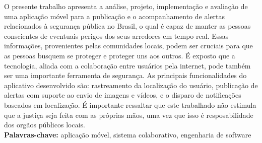 \documentclass[
	12pt,				%
	openright,			%
	oneside,			%
	a4paper,			%
	english,			%
	french,				%
	spanish,			%
	brazil,				%
	]{lib/abntex2}
\begin{document}




\setlength{\absparsep}{18pt} %

\begin{resumo}
	O presente trabalho apresenta a análise, projeto, implementação e avaliação de uma aplicação móvel para a publicação e o acompanhamento de alertas relacionados à segurança pública no Brasil, o qual é capaz de manter as pessoas conscientes de eventuais perigos dos seus arredores em tempo real. Essas informações, provenientes pelas comunidades locais, podem ser cruciais para que as pessoas busquem se proteger e proteger uns aos outros. É exposto que a tecnologia, aliada com a colaboração entre usuários pela internet, pode também ser uma importante ferramenta de segurança. As principais funcionalidades do aplicativo desenvolvido são: rastreamento da localização do usuário, publicação de alertas com suporte ao envio de imagens e vídeos, e o disparo de notificações baseados em localização. É importante ressaltar que este trabalhado não estimula que a justiça seja feita com as próprias mãos, uma vez que isso é resposabilidade dos orgãos públicos locais.
	\\
	\textbf{Palavras-chave:} aplicação móvel, sistema colaborativo, engenharia de software
\end{resumo}
\end{document}
